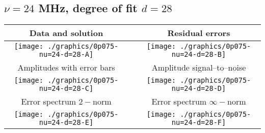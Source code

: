

% 

\clearpage{}
\break{}

\subsection{$\nu = 24$ MHz, degree of fit $d = 28$}

\begin{table}[h]
    \begin{center}
        \begin{tabular}{ccc}
            Data and solution & \quad & Residual errors \\\hline
            \texttt{[image: ./graphics/0p075-nu=24-d=28-A]} &&
            \texttt{[image: ./graphics/0p075-nu=24-d=28-B]} \\[15pt]
            Amplitudes with error bars && Amplitude signal--to--noise \\\hline
            \texttt{[image: ./graphics/0p075-nu=24-d=28-C]} &&
            \texttt{[image: ./graphics/0p075-nu=24-d=28-D]} \\[15pt]
            Error spectrum $2-$norm && Error spectrum $\infty-$norm \\\hline
            \texttt{[image: ./graphics/0p075-nu=24-d=28-E]} &&
            \texttt{[image: ./graphics/0p075-nu=24-d=28-F]} \\[15pt]
        \end{tabular}
    \end{center}
\label{fig:elev=75, nu=24}
\end{table}



\endinput
